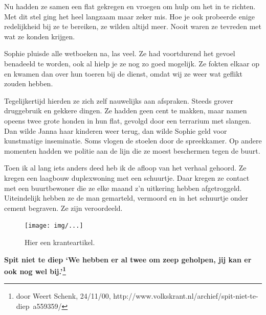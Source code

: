 \documentclass[12pt,twoside, openright]{memoir}
\begin{document}
Nu hadden ze samen een flat gekregen en vroegen om hulp om het in te richten. Met dit stel ging het heel langzaam maar zeker mis. Hoe je ook probeerde enige redelijkheid bij ze te bereiken, ze wilden altijd meer. Nooit waren ze tevreden met wat ze konden krijgen. 

Sophie pluisde alle wetboeken na, las veel. Ze had voortdurend het gevoel benadeeld te worden, ook al hielp je ze nog zo goed mogelijk. Ze fokten elkaar op en kwamen dan over hun toeren bij de dienst, omdat wij ze weer wat geflikt zouden hebben. 

Tegelijkertijd hierden ze zich zelf nauwelijks aan afspraken. Steeds grover druggebruik en gekkere dingen. Ze hadden geen cent te makken, maar namen opeens twee grote honden in hun flat, gevolgd door een terrarium met slangen. Dan wilde Janna haar kinderen weer terug, dan wilde Sophie geld voor kunstmatige inseminatie. Soms vlogen de stoelen door de spreekkamer. Op andere momenten hadden we politie aan de lijn die ze moest beschermen tegen de buurt. 

Toen ik al lang iets anders deed heb ik de afloop van het verhaal gehoord. Ze kregen een laagbouw duplexwoning met een schuurtje. Daar kregen ze contact met een buurtbewoner die ze elke maand z'n uitkering hebben afgetroggeld. Uiteindelijk hebben ze de man gemarteld, vermoord en in het schuurtje onder cement begraven. Ze zijn veroordeeld. 

\begin{figure}[t]
\texttt{[image: img/...]}
\caption{Hier een kranteartikel.}
\end{figure}

\textbf{Spit niet te diep
`We hebben er al twee om zeep geholpen, jij kan er ook nog wel bij.'\footnote{door Weert Schenk, 24/11/00, http://www.volkskrant.nl/archief/spit-niet-te-diep~a559359/}}


\end{document}
